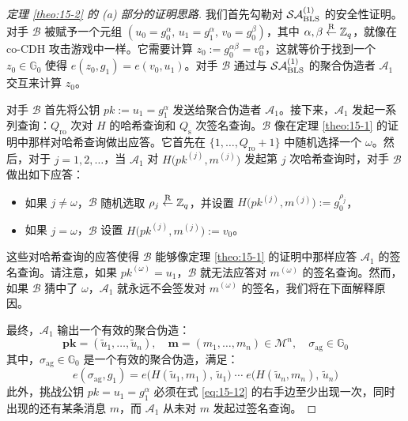 \begin{proof}[定理 \ref{theo:15-2} 的 (a) 部分的证明思路]
我们首先勾勒对 $\mathcal{SA}_{\rm BLS}^{(1)}$ 的安全性证明。对手 $\mathcal{B}$ 被赋予一个元组 $(u_0=g_0^\alpha,\,u_1=g_1^\alpha,\,v_0=g_0^\beta)$，其中 $\alpha,\beta\overset{\rm R}\leftarrow\mathbb{Z}_q$，就像在co-CDH 攻击游戏中一样。它需要计算 $z_0:=g_0^{\alpha\beta}=v_0^\alpha$，这就等价于找到一个 $z_0\in\mathbb{G}_0$ 使得 $e(z_0,g_1)=e(v_0,u_1)$。对手 $\mathcal{B}$ 通过与 $\mathcal{SA}_{\rm BLS}^{(1)}$ 的聚合伪造者 $\mathcal{A}_1$ 交互来计算 $z_0$。

对手 $\mathcal{B}$ 首先将公钥 $pk:=u_1=g_1^\alpha$ 发送给聚合伪造者 $\mathcal{A}_1$。接下来，$\mathcal{A}_1$ 发起一系列查询：$Q_\mathrm{ro}$ 次对 $H$ 的哈希查询和 $Q_\mathrm{s}$ 次签名查询。$\mathcal{B}$ 像在定理 \ref{theo:15-1} 的证明中那样对哈希查询做出应答。它首先在 $\{1,\dots,Q_\mathrm{ro}+1\}$ 中随机选择一个 $\omega$。然后，对于 $j=1,2,\dots$，当 $\mathcal{A}_1$ 对 $H\big(pk^{(j)},m^{(j)}\big)$ 发起第 $j$ 次哈希查询时，对手 $\mathcal{B}$ 做出如下应答：
\begin{itemize}
	\item 如果 $j\neq\omega$，$\mathcal{B}$ 随机选取 $\rho_j\overset{\rm R}\leftarrow\mathbb{Z}_q$，并设置 $H\big(pk^{(j)},m^{(j)}\big):=g_0^{\rho_j}$，
	\item 如果 $j=\omega$，$\mathcal{B}$ 设置 $H\big(pk^{(j)},m^{(j)}\big):=v_0$。
\end{itemize}
这些对哈希查询的应答使得 $\mathcal{B}$ 能够像定理 \ref{theo:15-1} 的证明中那样应答 $\mathcal{A}_1$ 的签名查询。请注意，如果 $pk^{(\omega)}=u_1$，$\mathcal{B}$ 就无法应答对 $m^{(\omega)}$ 的签名查询。然而，如果 $\mathcal{B}$ 猜中了 $\omega$，$\mathcal{A}_1$ 就永远不会签发对 $m^{(\omega)}$ 的签名，我们将在下面解释原因。

最终，$\mathcal{A}_1$ 输出一个有效的聚合伪造：
\begin{equation}\label{eq:15-11}
\boldsymbol{pk}=(\tilde{u}_1,\dots,\tilde{u}_n),
\quad
\boldsymbol{m}=(m_1,\dots,m_n)\in\mathcal{M}^n,
\quad
\sigma_\mathrm{ag}\in\mathbb{G}_0
\end{equation}
其中，$\sigma_\mathrm{ag}\in\mathbb{G}_0$ 是一个有效的聚合伪造，满足：
\begin{equation}\label{eq:15-12}
e(\sigma_\mathrm{ag},g_1)=e\big(H(\tilde{u}_1,m_1),\,\tilde{u}_1\big)\;\cdots\;e\big(H(\tilde{u}_n,m_n),\,\tilde{u}_n\big)
\end{equation}
此外，挑战公钥 $pk=u_1=g_1^\alpha$ 必须在式 \ref{eq:15-12} 的右手边至少出现一次，同时出现的还有某条消息 $m$，而 $\mathcal{A}_1$ 从未对 $m$ 发起过签名查询。


\end{proof}
